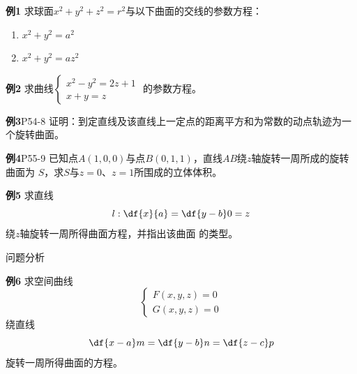 \begin{frame}
	\linespread{1.2}
	\begin{exampleblock}{{\bf 例1}\hfill}
		求球面$x^2+y^2+z^2=r^2$与以下曲面的交线的参数方程：
		\begin{enumerate}
		  \item $x^2+y^2=a^2$
		  \item $x^2+y^2=az^2$
		\end{enumerate}
	\end{exampleblock}
	\pause
	\bigskip
	\begin{exampleblock}{{\bf 例2}\hfill}
		求曲线$\left\{\begin{array}{l}
			x^2-y^2=2z+1\\
			x+y=z
		\end{array}\right.$
		的参数方程。
	\end{exampleblock}
\end{frame}

\begin{frame}
	\linespread{1.5}
	\begin{exampleblock}{{\bf 例3}\hfill P54-8}
		证明：到定直线及该直线上一定点的距离平方和为常数的动点轨迹为一个旋转曲面。
	\end{exampleblock}
	\pause
	\bigskip
	\begin{exampleblock}{{\bf 例4}\hfill P55-9}
		已知点$A(1,0,0)$与点$B(0,1,1)$，直线$AB$绕$z$轴旋转一周所成的旋转曲面为
		$S$，求$S$与$z=0$、$z=1$所围成的立体体积。
	\end{exampleblock}
\end{frame}

\begin{frame}
	\linespread{1.2}
	\begin{exampleblock}{{\bf 例5}\hfill}
		求直线
		$$l:\df{x}{a}=\df{y-b}0=z$$绕$z$轴旋转一周所得曲面方程，并指出该曲面
		的类型。
	\end{exampleblock}
\end{frame}

\begin{frame}{问题分析}
	\linespread{1.2}
	\begin{exampleblock}{{\bf 例6}\hfill}
		求空间曲线$$\left\{\begin{array}{l}
		F(x,y,z)=0\\ G(x,y,z)=0
		\end{array}\right.$$绕直线
		$$\df{x-a}m=\df{y-b}n=\df{z-c}p$$
		旋转一周所得曲面的方程。
	\end{exampleblock}
\end{frame}

